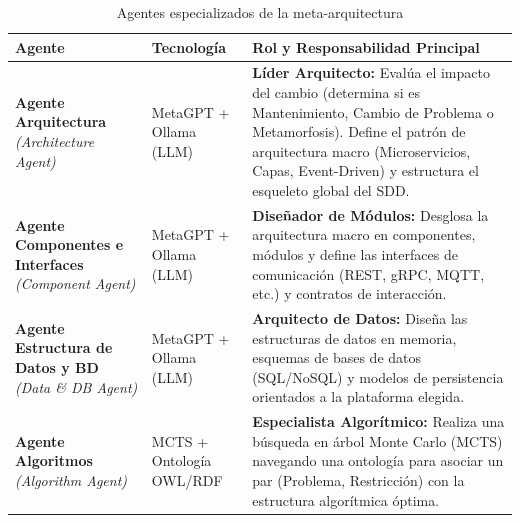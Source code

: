 \documentclass[12pt, letterpaper, oneside]{book}
\begin{document}
\begin{table}[htbp] \centering \caption{Agentes especializados de la meta-arquitectura} \label{tab:agentes_metaarquitectura} \renewcommand{\arraystretch}{1.2} 
	\begin{tabularx}{\textwidth}{|p{3.5cm}|p{3cm}|X|} \hline
		 \textbf{Agente} & \textbf{Tecnología} & \textbf{Rol y Responsabilidad Principal} \\ \hline
		 \textbf{Agente Arquitectura} \newline \textit{(Architecture Agent)} & MetaGPT + Ollama (LLM) & \textbf{Líder Arquitecto:} Evalúa el impacto del cambio (determina si es Mantenimiento, Cambio de Problema o Metamorfosis). Define el patrón de arquitectura macro (Microservicios, Capas, Event-Driven) y estructura el esqueleto global del SDD. \\ \hline 
		 \textbf{Agente Componentes e Interfaces} \newline \textit{(Component Agent)} & MetaGPT + Ollama (LLM) & \textbf{Diseñador de Módulos:} Desglosa la arquitectura macro en componentes, módulos y define las interfaces de comunicación (REST, gRPC, MQTT, etc.) y contratos de interacción. \\ \hline
		 \textbf{Agente Estructura de Datos y BD} \newline \textit{(Data \& DB Agent)} & MetaGPT + Ollama (LLM) & \textbf{Arquitecto de Datos:} Diseña las estructuras de datos en memoria, esquemas de bases de datos (SQL/NoSQL) y modelos de persistencia orientados a la plataforma elegida. \\ \hline 
		 \textbf{Agente Algoritmos} \newline \textit{(Algorithm Agent)} & MCTS + Ontología OWL/RDF & \textbf{Especialista Algorítmico:} Realiza una búsqueda en árbol Monte Carlo (MCTS) navegando una ontología para asociar un par (Problema, Restricción) con la estructura algorítmica óptima. \\ \hline \end{tabularx} \end{table}
\end{document}
